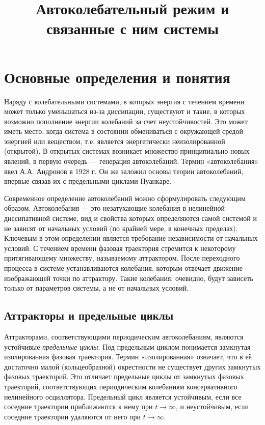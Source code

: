 \documentclass[a4paper,12pt]{article}
\title{Автоколебательный режим и связанные с ним системы}
\author{}
\date{}
\begin{document}
\maketitle

\section{Основные определения и понятия}

Наряду с колебательными системами, в которых энергия с течением времени может только уменьшаться из-за диссипации, существуют и такие, в которых возможно пополнение энергии колебаний за счет неустойчивостей. Это может иметь место, когда система в состоянии обмениваться с окружающей средой энергией или веществом, т.е. является энергетически неизолированной (открытой). В открытых системах возникает множество принципиально новых явлений, в первую очередь — генерация автоколебаний. Термин «автоколебания» ввел А.А. Андронов в 1928 г. Он же заложил основы теории автоколебаний, впервые связав их с предельными циклами Пуанкаре.

Современное определение автоколебаний можно сформулировать следующим образом. Автоколебания — это незатухающие колебания в нелинейной диссипативной системе, вид и свойства которых определяются самой системой и не зависят от начальных условий (по крайней мере, в конечных пределах). Ключевым в этом определении является требование независимости от начальных условий. С течением времени фазовая траектория стремится к некоторому притягивающему множеству, называемому аттрактором. После переходного процесса в системе устанавливаются колебания, которым отвечает движение изображающей точки по аттрактору. Такие колебания, очевидно, будут зависеть только от параметров системы, а не от начальных условий.

\subsection{Аттракторы и предельные циклы}

Аттракторами, соответствующими периодическим автоколебаниям, являются устойчивые \textit{предельные циклы}. Под предельным циклом понимается замкнутая изолированная фазовая траектория. Термин «изолированная» означает, что в её достаточно малой (кольцеобразной) окрестности не существует других замкнутых фазовых траекторий. Это отличает предельные циклы от замкнутых фазовых траекторий, соответствующих периодическим колебаниям консервативного нелинейного осциллятора. Предельный цикл является устойчивым, если все соседние траектории приближаются к нему при \( t \to \infty \), и неустойчивым, если соседние траектории удаляются от него при \( t \to \infty \).
\end{document}
